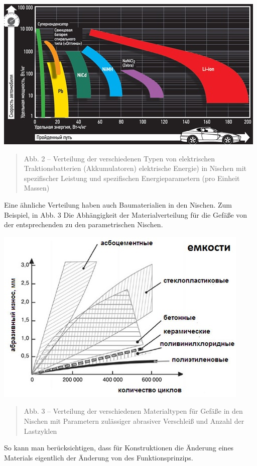 \documentclass[11pt,a4paper]{article}
\begin{document}
\begin{center}
  \includegraphics[width=.7\textwidth]{2164-2.jpg}
  \begin{quote}
    Abb. 2 -- Verteilung der verschiedenen Typen von elektrischen
    Traktionsbatterien (Akkumulatoren) elektrische Energie) in Nischen mit
    spezifischer Leistung und spezifischen Energieparametern (pro Einheit
    Massen)
  \end{quote}
\end{center}
Eine ähnliche Verteilung haben auch Baumaterialien in den Nischen. Zum
Beispiel, in Abb. 3 Die Abhängigkeit der Materialverteilung für die Gefäße von
der entsprechenden zu den parametrischen Nischen.
\begin{center}
  \includegraphics[width=.7\textwidth]{2164-3.jpg}
  \begin{quote}
    Abb. 3 -- Verteilung der verschiedenen Materialtypen für Gefäße in den
    Nischen mit Parametern zulässiger abrasiver Verschleiß und Anzahl der
    Lastzyklen
  \end{quote}
\end{center}
So kann man berücksichtigen, dass für Konstruktionen die Änderung eines
Materials eigentlich der Änderung von des Funktionsprinzips.
\end{document}
